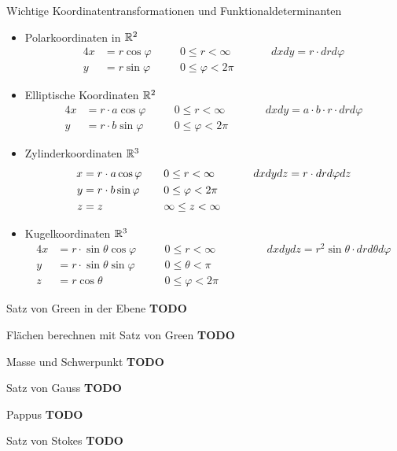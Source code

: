 \begin{Rechenregeln}{Wichtige Koordinatentransformationen und Funktionaldeterminanten}{}
    \begin{itemize}
       \item Polarkoordinaten in $\mathbb{R}^2$ \begin{alignat*}{4}
            x &= r \cos \varphi\quad &&0 \leq r < \infty\quad &&&dxdy = r \cdot drd\varphi\\
            y &= r \sin \varphi\quad &&0 \leq \varphi < 2\pi\quad
        \end{alignat*}
        \item Elliptische Koordinaten $\mathbb{R}^2$ \begin{alignat*}{4}
            x &= r \cdot  a \cos \varphi\quad &&0 \leq r < \infty\quad &&&dxdy = a \cdot b \cdot  r \cdot drd\varphi\\
            y &= r \cdot b \sin \varphi\quad &&0 \leq \varphi < 2\pi\quad
        \end{alignat*}
        \item Zylinderkoordinaten $\mathbb{R}^3$ \begin{alignat*}{4}
            x &= r \cdot  a \cos \varphi\quad &&0 \leq r < \infty\quad &&&dxdydz = r \cdot drd\varphi dz\\
            y &= r \cdot b \sin \varphi\quad &&0 \leq \varphi < 2\pi\quad\\
            z &= z\quad &&\-\infty \leq z < \infty\quad
        \end{alignat*}
        \item Kugelkoordinaten $\mathbb{R}^3$ \begin{alignat*}{4}
            x &= r \cdot \sin \theta \cos \varphi \quad &&0 \leq r < \infty\quad &&&dxdydz = r^2 \sin \theta \cdot drd\theta d\varphi\\
            y &= r \cdot \sin \theta \sin \varphi \quad && 0 \leq \theta < \pi\quad\\
            z &= r \cos \theta \quad &&0 \leq \varphi < 2\pi\quad\quad
        \end{alignat*}
   \end{itemize}
\end{Rechenregeln}

\begin{Satz}{Satz von Green in der Ebene}{}
	\textbf{TODO}	
\end{Satz}

\begin{Rezept}{Flächen berechnen mit Satz von Green}{}
	\textbf{TODO}	
\end{Rezept}

\begin{Satz}{Masse und Schwerpunkt}{}
	\textbf{TODO}	
\end{Satz}

\begin{Satz}{Satz von Gauss}{}
	\textbf{TODO}	
\end{Satz}

\begin{Satz}{Pappus}{}
	\textbf{TODO}	
\end{Satz}

\begin{Satz}{Satz von Stokes}{}
	\textbf{TODO}	
\end{Satz}

